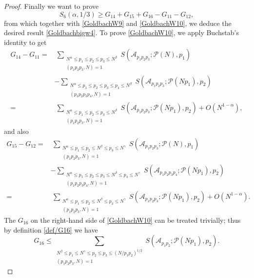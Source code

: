 \documentclass[12pt, a4paper]{amsart}
\def\leq{\leqslant}
\def\le{\leqslant}
\def\ge{\geqslant}
\theoremstyle{plain}
\theoremstyle{remark}
\numberwithin{equation}{section}
\begin{document}
\begin{proof}
Finally we want to prove  
\begin{equation}\label{GoldbachW10}
S_6(\alpha,1/3)\ge G_{14}+G_{15}+G_{16}-G_{11}-G_{12},
\end{equation}
from which together with \eqref{GoldbachW9} and \eqref{GoldbachW10}, we deduce the desired 
result \eqref{Goldbachbigw4}. To prove \eqref{GoldbachW10}, we apply Buchstab's identity to get 
\begin{equation}\label{GoldbachW11}
\begin{split}
G_{14}-G_{11}
=&\ \sum_{\substack{N^\alpha \le p_1 \le p_2 \le p_3\le N^\beta \\ (p_1 p_2 p_3, N) = 1}}  S(\mathscr{A}_{p_1 p_2 p_3}; \mathscr{P}(N), p_1)\\&-\sum_{\substack{N^\alpha \le p_1 \le p_2 \le p_3\le p_4\le N^\beta \\ (p_1 p_2 p_3 p_4, N) = 1}}  S(\mathscr{A}_{p_1 p_2 p_3}; \mathscr{P}(Np_1), p_2)\\
=&\ \sum_{\substack{N^\alpha \le p_1 \le p_2 \le p_3\le N^\beta \\ (p_1 p_2 p_3, N) = 1}}  S(\mathscr{A}_{p_1 p_2 p_3}; \mathscr{P}(Np_1), p_2)+O(N^{1-\alpha}),
\end{split}
\end{equation}
and also 
\begin{equation}\label{GoldbachW12}
\begin{split}
G_{15}-G_{12}
=&\ \sum_{\substack{N^{\alpha} \leq p_1 \le p_2 \le N^{\beta} \leq p_3 \le N^{\gamma}\\ (p_1 p_2 p_3, N) = 1}} S(\mathscr{A}_{p_1 p_2 p_3}; \mathscr{P}(N), p_1)\\&-\sum_{\substack{N^{\alpha} \leq p_1 \le p_2 \le p_3 \le N^{\beta} \leq p_4 \le N^{\gamma} \\ (p_1 p_2 p_3 p_4, N) = 1}} S(\mathscr{A}_{p_1 p_2 p_3 p_4}; \mathscr{P}(Np_1), p_2)\\
=&\ \sum_{\substack{N^{\alpha} \leq p_1 \le p_2 \le N^{\beta} \leq p_3 \le N^{\gamma}\\ (p_1 p_2 p_3, N) = 1}} S(\mathscr{A}_{p_1 p_2 p_3}; \mathscr{P}(Np_1), p_2)+O(N^{1-\alpha}). 
\end{split}
\end{equation}
The $G_{16}$ on the right-hand side of \eqref{GoldbachW10} can be treated trivially; 
thus by definition \eqref{def/G16} we have 
\begin{equation}\label{GoldbachW13}
G_{16}
\le \sum_{\substack{N^{\beta} \leq p_1 \le N^{\gamma} \leq p_2 \le p_3\le (N/p_1p_2)^{1/2} \\ (p_1 p_2 p_3, N) = 1}} S(\mathscr{A}_{p_1 p_2}; \mathscr{P}(N p_1), p_2). 

\end{equation}
\end{proof}
\end{document}
